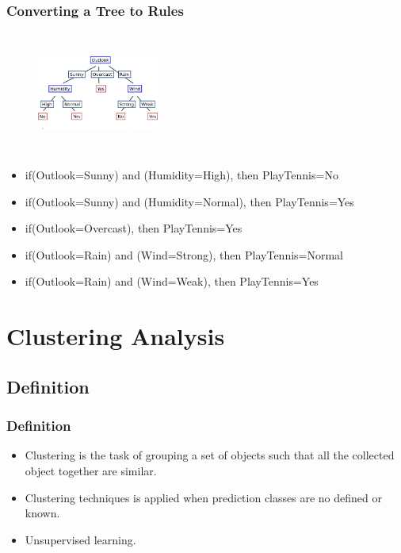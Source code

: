 \documentclass{beamer}
\begin{document}
\begin{frame}
    \frametitle{Converting a Tree to Rules}
    \begin{figure}
        \centering
        \includegraphics[width=40mm,height=40mm,keepaspectratio]{assets/images/fulltree.png}
    \end{figure}
    
    \begin{itemize}
        \item if(Outlook=Sunny) and (Humidity=High), then PlayTennis=No
        \item if(Outlook=Sunny) and (Humidity=Normal), then PlayTennis=Yes
        \item if(Outlook=Overcast), then PlayTennis=Yes
        \item if(Outlook=Rain) and (Wind=Strong), then PlayTennis=Normal
        \item if(Outlook=Rain) and (Wind=Weak), then PlayTennis=Yes 
    \end{itemize}

\end{frame}

\section{Clustering Analysis}


\subsection{Definition}

\begin{frame}
    \frametitle{Definition}

\begin{itemize}
    \item     Clustering is the task of grouping a set of objects such that all the collected object together are similar.
    \item Clustering techniques is applied when prediction classes are no defined or known.
    \item Unsupervised learning.
\end{itemize}
    

\end{frame}
\end{document}
